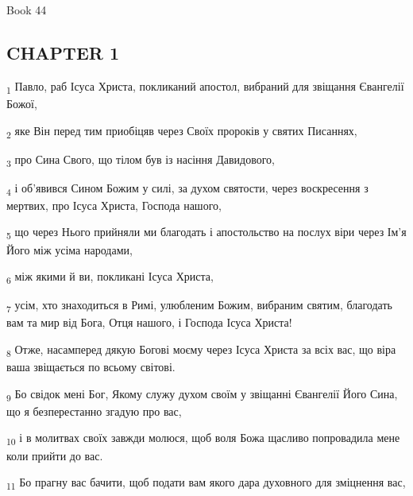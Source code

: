 Book 44
\subsection{CHAPTER 1}
\begin{tcolorbox}
\textsubscript{1} Павло, раб Ісуса Христа, покликаний апостол, вибраний для звіщання Євангелії Божої,
\end{tcolorbox}
\begin{tcolorbox}
\textsubscript{2} яке Він перед тим приобіцяв через Своїх пророків у святих Писаннях,
\end{tcolorbox}
\begin{tcolorbox}
\textsubscript{3} про Сина Свого, що тілом був із насіння Давидового,
\end{tcolorbox}
\begin{tcolorbox}
\textsubscript{4} і об'явився Сином Божим у силі, за духом святости, через воскресення з мертвих, про Ісуса Христа, Господа нашого,
\end{tcolorbox}
\begin{tcolorbox}
\textsubscript{5} що через Нього прийняли ми благодать і апостольство на послух віри через Ім'я Його між усіма народами,
\end{tcolorbox}
\begin{tcolorbox}
\textsubscript{6} між якими й ви, покликані Ісуса Христа,
\end{tcolorbox}
\begin{tcolorbox}
\textsubscript{7} усім, хто знаходиться в Римі, улюбленим Божим, вибраним святим, благодать вам та мир від Бога, Отця нашого, і Господа Ісуса Христа!
\end{tcolorbox}
\begin{tcolorbox}
\textsubscript{8} Отже, насамперед дякую Богові моєму через Ісуса Христа за всіх вас, що віра ваша звіщається по всьому світові.
\end{tcolorbox}
\begin{tcolorbox}
\textsubscript{9} Бо свідок мені Бог, Якому служу духом своїм у звіщанні Євангелії Його Сина, що я безперестанно згадую про вас,
\end{tcolorbox}
\begin{tcolorbox}
\textsubscript{10} і в молитвах своїх завжди молюся, щоб воля Божа щасливо попровадила мене коли прийти до вас.
\end{tcolorbox}
\begin{tcolorbox}
\textsubscript{11} Бо прагну вас бачити, щоб подати вам якого дара духовного для зміцнення вас,
\end{tcolorbox}
